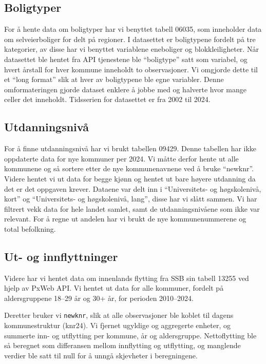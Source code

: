 \documentclass[
  norsk,
  letterpaper,
  DIV=11,
  numbers=noendperiod]{scrartcl}
\begin{document}
\subsection{Boligtyper}\label{boligtyper}

For å hente data om boligtyper har vi benyttet tabell 06035, som
inneholder data om selveierboliger for delt på regioner. I datasettet er
boligtypene fordelt på tre kategorier, av disse har vi benyttet
variablene eneboliger og blokkleiligheter. Når datasettet ble hentet fra
API tjenestene ble ``boligtype'' satt som variabel, og hvert årstall for
hver kommune inneholdt to observasjoner. Vi omgjorde dette til et ``long
format'' slik at hver av boligtypene ble egne variabler. Denne
omformateringen gjorde dataset enklere å jobbe med og halverte hvor
mange celler det inneholdt. Tidsserien for datasettet er fra 2002 til
2024.

\subsection{Utdanningsnivå}\label{utdanningsnivuxe5}

For å finne utdanningsnivå har vi brukt tabellen 09429. Denne tabellen
har ikke oppdaterte data for nye kommuner per 2024. Vi måtte derfor
hente ut alle kommunene og så sortere etter de nye kommunenavnene ved å
bruke ``newknr''. Videre hentet vi ut data for begge kjønn og hentet ut
bare høyere utdanning da det er det oppgaven krever. Dataene var delt
inn i ``Universitets- og høgskolenivå, kort'' og ``Universitets- og
høgskolenivå, lang'', disse har vi slått sammen. Vi har filtrert vekk
data for hele landet samlet, samt de utdanningsnivåene som ikke var
relevant. For å regne ut andelen har vi brukt de nye kommunenummerene og
total befolkning.

\subsection{Ut- og innflyttninger}\label{ut--og-innflyttninger}

Videre har vi hentet data om innenlands flytting fra SSB sin tabell
13255 ved hjelp av PxWeb API. Vi hentet ut data for alle kommuner,
fordelt på aldersgruppene 18--29 år og 30+ år, for perioden 2010--2024.

Deretter bruker vi \texttt{newknr}, slik at alle observasjoner ble
koblet til dagens kommunestruktur (knr24). Vi fjernet ugyldige og
aggregerte enheter, og summerte inn- og utflytting per kommune, år og
aldersgruppe. Nettoflytting ble så beregnet som differansen mellom
innflytting og utflytting, og manglende verdier ble satt til null for å
unngå skjevheter i beregningene.
\end{document}
